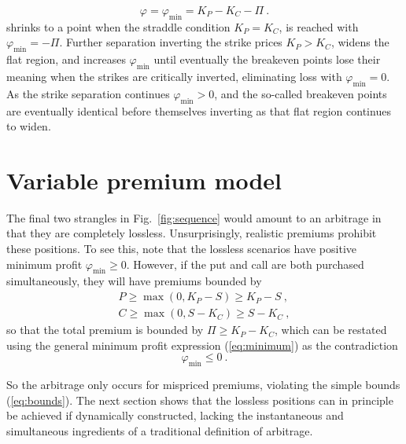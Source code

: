 \documentclass[aps,reprint]{revtex4-2}
\begin{document}
\begin{equation} \label{eq:minimum}
\varphi = \varphi_{\min} = K_P - K_C - \Pi~.
\end{equation}
shrinks to a point when the straddle condition $K_P = K_C$, is reached with $\varphi_{\min} = -\Pi$.
Further separation inverting the strike prices $K_P > K_C$, widens the flat region, and increases $\varphi_{\min}$ 
until eventually the breakeven points lose their meaning when the strikes are critically inverted, 
eliminating loss with $\varphi_{\min} = 0$.  
As the strike separation continues $\varphi_{\min} > 0$, and the so-called breakeven points are eventually identical before themselves inverting as that flat region continues to widen.

\section{Variable premium model}

The final two strangles in Fig.~\ref{fig:sequence} would amount to an arbitrage in that they are completely lossless.  Unsurprisingly, realistic premiums prohibit these positions.  To see this, note that the lossless scenarios have positive minimum profit  $\varphi_{\min} \ge 0$.
However, if the put and call are both purchased simultaneously, they will have premiums bounded by 
\begin{subequations} \label{eq:bounds}
\begin{align}
P \ge \max(0, K_P - S) \ge K_P - S~,\\
C \ge \max(0, S - K_C) \ge S - K_C~,
\end{align}
\end{subequations}
so that the total premium is bounded by $\Pi \ge K_P - K_C$, which can be restated using the general minimum profit expression (\ref{eq:minimum}) as the contradiction
\begin{equation}
\varphi_{\min} \le 0~.
\end{equation}

So the arbitrage only occurs for mispriced premiums, violating the simple bounds (\ref{eq:bounds}).  The next section shows that the lossless positions can in principle be achieved if dynamically constructed, lacking the instantaneous and simultaneous ingredients of a traditional definition of arbitrage.
\end{document}
